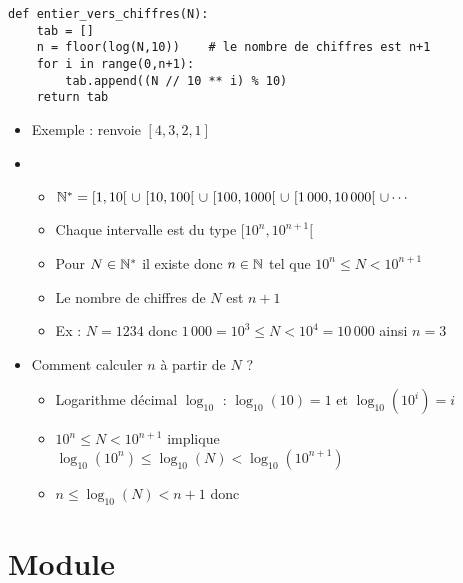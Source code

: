 \begin{frame}[fragile]

\begin{algo}[decimale.py (2)]
\small
\begin{lstlisting}
def entier_vers_chiffres(N):
    tab = []
    n = floor(log(N,10))    # le nombre de chiffres est n+1 
    for i in range(0,n+1):
        tab.append((N // 10 ** i) % 10)
    return tab
\end{lstlisting}  
\end{algo}

\pause

\begin{itemize}
  \item Exemple :  renvoie $[4,3,2,1]$
\pause
  \item 
  \begin{itemize}
    \item $\Nn^* =  [1,10[  \ \cup  \ [10,100[ \ \cup \  [100,1000[ \  \cup \  [1\,000,10\, 000[ \ \cup \cdots$ 
\pause
    \item Chaque intervalle est du type $[10^n,10^{n+1}[$
\pause
    \item Pour $N \in \mathbb{N}^*$ il existe donc $n\in\mathbb{N}$ tel que $10^n \le N < 10^{n+1}$
\pause
    \item Le nombre de chiffres de $N$ est $n+1$
\pause
    \item Ex : $N=1234$ donc $1 \, 000 = 10^3 \le N < 10^4 = 10\, 000$ ainsi $n=3$
  \end{itemize}
\pause
  \item Comment calculer $n$ à partir de $N$ ? 
  \begin{itemize}
\pause
    \item Logarithme décimal $\log_{10}$ :  $\log_{10}(10) = 1$ et $\log_{10}(10^i) = i$
\pause
    \item $10^n \le N < 10^{n+1}$ implique $\log_{10}(10^n) \le \log_{10}(N) < \log_{10}(10^{n+1})$
\pause
    \item $n \le \log_{10}(N) < n+1$ donc 
  \end{itemize}
\end{itemize}

\end{frame}






\section{Module }

